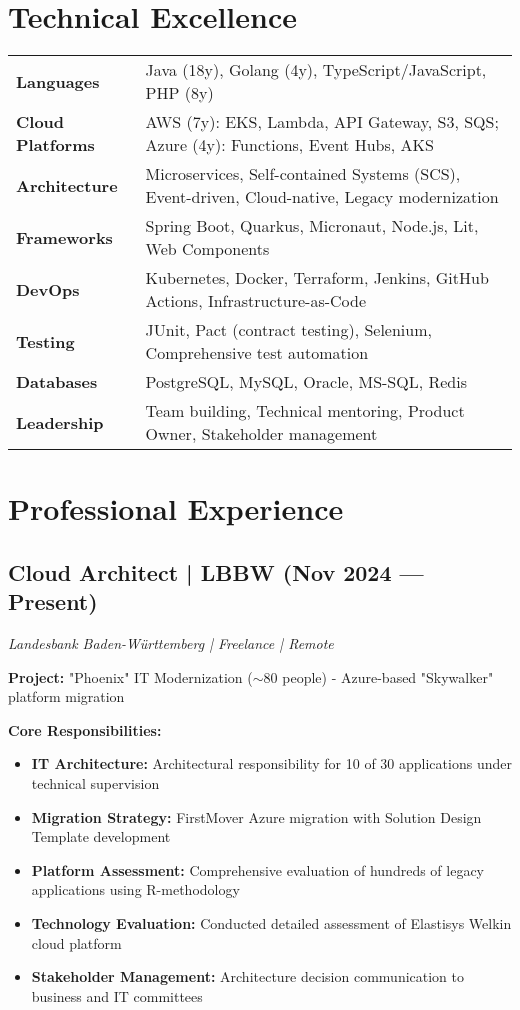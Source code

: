 \documentclass[10pt,a4paper]{article}
\begin{document}
\section{Technical Excellence}

\begin{tabularx}{\textwidth}{@{}p{3cm}X@{}}
\textbf{Languages} & Java (18y), Golang (4y), TypeScript/JavaScript, PHP (8y) \\
\textbf{Cloud Platforms} & AWS (7y): EKS, Lambda, API Gateway, S3, SQS; Azure (4y): Functions, Event Hubs, AKS \\
\textbf{Architecture} & Microservices, Self-contained Systems (SCS), Event-driven, Cloud-native, Legacy modernization \\
\textbf{Frameworks} & Spring Boot, Quarkus, Micronaut, Node.js, Lit, Web Components \\
\textbf{DevOps} & Kubernetes, Docker, Terraform, Jenkins, GitHub Actions, Infrastructure-as-Code \\
\textbf{Testing} & JUnit, Pact (contract testing), Selenium, Comprehensive test automation \\
\textbf{Databases} & PostgreSQL, MySQL, Oracle, MS-SQL, Redis \\
\textbf{Leadership} & Team building, Technical mentoring, Product Owner, Stakeholder management \\
\end{tabularx}

\newpage

\section{Professional Experience}

\subsection{Cloud Architect | LBBW (Nov 2024 — Present)}
\textit{Landesbank Baden-Württemberg | Freelance | Remote}

\textbf{Project:} "Phoenix" IT Modernization ($\sim$80 people) - Azure-based "Skywalker" platform migration

\textbf{Core Responsibilities:}
\begin{itemize}[leftmargin=*,noitemsep,topsep=0pt]
\item \textbf{IT Architecture:} Architectural responsibility for 10 of 30 applications under technical supervision
\item \textbf{Migration Strategy:} FirstMover Azure migration with Solution Design Template development
\item \textbf{Platform Assessment:} Comprehensive evaluation of hundreds of legacy applications using R-methodology
\item \textbf{Technology Evaluation:} Conducted detailed assessment of Elastisys Welkin cloud platform
\item \textbf{Stakeholder Management:} Architecture decision communication to business and IT committees
\end{itemize}
\end{document}
